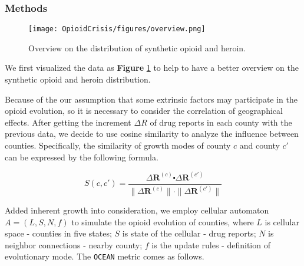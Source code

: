 \documentclass[a4paper]{article}
\begin{document}
\subsubsection*{Methods}

\begin{figure}[h]
	\centering  
	\texttt{[image: OpioidCrisis/figures/overview.png]} 
	\caption{Overview on the distribution of synthetic opioid and heroin.} 
	\label{fig:overview}  
\end{figure}

We first visualized the data as \textbf{Figure} \ref{fig:overview} to help to have a better overview on the synthetic opioid and heroin distribution.

Because of the our assumption that some extrinsic factors may participate in the opioid evolution, so it is necessary to consider the correlation of geographical effects. After getting the increment $\Delta R$ of drug reports in each county with the previous data, we decide to use cosine similarity to analyze the influence between counties. Specifically, the similarity of growth modes of county $c$ and county $c'$ can be expressed by the following formula.
  
\begin{equation}
    S(c,c')=\frac{\Delta \mathbf{R}^{(c)}\centerdot \Delta \mathbf{R}^{(c')}}{\|\Delta \mathbf{R}^{(c)}\|\cdot\|\Delta \mathbf{R}^{(c')}\|}
\end{equation}
\vspace{4pt}

Added inherent growth into consideration, we employ cellular automaton $A= (L,S,N,f)$ to simulate the opioid evolution of counties, where $L$ is cellular space - counties in five states; $S$ is state of the cellular - drug reports; $N$ is neighbor connections - nearby county; $f$ is the update rules - definition of evolutionary mode. The \texttt{OCEAN} metric comes as follows.
\end{document}

